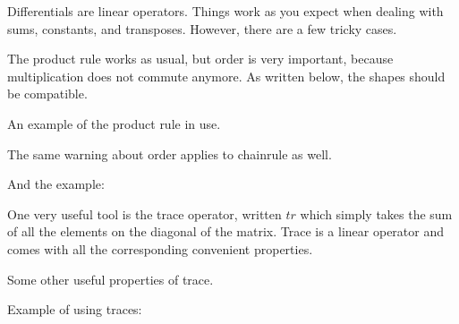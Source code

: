 \documentclass[12pt]{article}
\begin{document}
Differentials are linear operators. Things work as you expect when dealing with sums, constants, and transposes. However, there are a few tricky cases.

The product rule works as usual, but order is very important, because multiplication does not commute anymore. As written below, the shapes should be compatible. 

An example of the product rule in use.


The same warning about order applies to chainrule as well.

And the example:


One very useful tool is the trace operator, written $tr$ which simply takes the sum of all the elements on the diagonal of the matrix. Trace is a linear operator and comes with all the corresponding convenient properties. 

Some other useful properties of trace.


Example of using traces:

\end{document}
